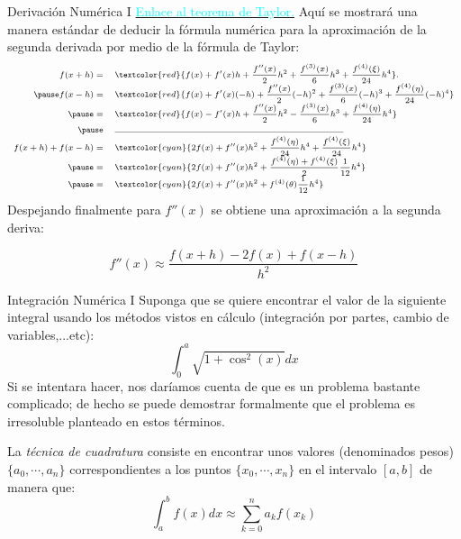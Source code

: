 \begin{frame}{Derivación Numérica I}
\small
\label{DeduccionFormulaSegundoOrden}
\hyperlink{TeoremaTaylor}{\textcolor{cyan}{Enlace al teorema de Taylor.}}
\indent Aquí se mostrará una manera estándar de deducir la fórmula numérica para la aproximación de la segunda derivada por medio de la fórmula de Taylor:
\begin{displaymath}
\scriptsize
\begin{array}{rl}
\renewcommand{\arraystretch}{1.5}
f(x+h)= &\textcolor{red}{f(x)+f'(x)h+\dfrac{f''(x)}{2}h^2+\dfrac{f^{(3)}(x)}{6}h^3+\dfrac{f^{(4)}(\xi)}{24}h^4}.\\\pause
f(x-h)=&\textcolor{red}{f(x)+f'(x)(-h)+\dfrac{f''(x)}{2}(-h)^2+\dfrac{f^{(3)}(x)}{6}(-h)^3+\dfrac{f^{(4)}(\eta)}{24}(-h)^4}\\\pause
=&\textcolor{red}{f(x)-f'(x)h+\dfrac{f''(x)}{2}h^2-\dfrac{f^{(3)}(x)}{6}h^3+\dfrac{f^{(4)}(\eta)}{24}h^4}\\\pause
&\rule{7cm}{0.01cm}\\
f(x+h)+f(x-h)=&\textcolor{cyan}{2f(x)+f''(x)h^2+\dfrac{f^{(4)}(\eta)}{24}h^4+\dfrac{f^{(4)}(\xi)}{24}h^4}\\\pause
=&\textcolor{cyan}{2f(x)+f''(x)h^2+\dfrac{f^{(4)}(\eta)+f^{(4)}(\xi)}{2}\dfrac{1}{12}h^4}\\\pause
=&\textcolor{cyan}{2f(x)+f''(x)h^2+f^{(4)}(\theta)\dfrac{1}{12}h^4}\\
\end{array}
\end{displaymath}
Despejando finalmente para $f''(x)$ se obtiene una aproximación a la segunda deriva:
\begin{Def}
$$f''(x)\approx\dfrac{f(x+h)-2f(x)+f(x-h)}{h^2}$$
\end{Def}
\end{frame}
\begin{frame}{Integración Numérica I}
\indent Suponga que se quiere encontrar el valor de la siguiente integral usando los métodos vistos en cálculo (integración por partes, cambio de variables,...etc):
$$\int_{0}^{a}\sqrt{1+\cos^2(x)}dx$$
\indent Si se intentara hacer, nos daríamos cuenta de que es un problema bastante complicado; de hecho se puede demostrar formalmente que el problema es irresoluble planteado en estos términos. 
\begin{Def}
La \textit{técnica de cuadratura}  consiste en encontrar unos valores (denominados pesos) $\{a_0,\cdots,a_n\}$ correspondientes a los puntos $\{x_0,\cdots, x_n\}$ en el intervalo $[a,b]$  de manera que: 
$$\int_{a}^{b}f(x)dx\approx \sum_{k=0}^{n}a_kf(x_k)$$
\end{Def}
\end{frame}
